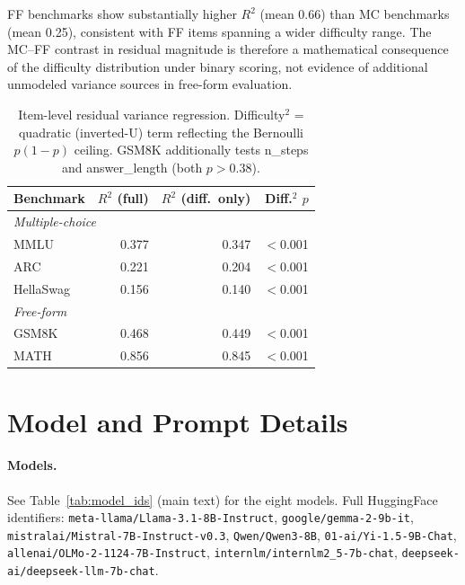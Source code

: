 FF benchmarks show substantially higher $R^2$ (mean 0.66) than MC benchmarks (mean 0.25), consistent with FF items spanning a wider difficulty range. The MC--FF contrast in residual magnitude is therefore a mathematical consequence of the difficulty distribution under binary scoring, not evidence of additional unmodeled variance sources in free-form evaluation.

\begin{table}[h]
\centering
\caption{Item-level residual variance regression. Difficulty$^2$ = quadratic (inverted-U) term reflecting the Bernoulli $p(1{-}p)$ ceiling. GSM8K additionally tests n\_steps and answer\_length (both $p > 0.38$).}
\label{tab:ff_residual}
\scriptsize
\begin{tabular}{lrrr}
\toprule
Benchmark & $R^2$ (full) & $R^2$ (diff.\ only) & Diff.$^2$ $p$ \\
\midrule
\multicolumn{4}{l}{\textit{Multiple-choice}} \\
MMLU & 0.377 & 0.347 & $<$0.001 \\
ARC & 0.221 & 0.204 & $<$0.001 \\
HellaSwag & 0.156 & 0.140 & $<$0.001 \\
\midrule
\multicolumn{4}{l}{\textit{Free-form}} \\
GSM8K & 0.468 & 0.449 & $<$0.001 \\
MATH & 0.856 & 0.845 & $<$0.001 \\
\bottomrule
\end{tabular}
\end{table}

\section{Model and Prompt Details}
\label{app:models}

\paragraph{Models.} See Table~\ref{tab:model_ids} (main text) for the eight models. Full HuggingFace identifiers: \texttt{meta-llama/Llama-3.1-8B-Instruct}, \texttt{google/gemma-2-9b-it}, \texttt{mistralai/Mistral-7B-Instruct-v0.3}, \texttt{Qwen/Qwen3-8B}, \texttt{01-ai/Yi-1.5-9B-Chat}, \texttt{allenai/OLMo-2-1124-7B-Instruct}, \texttt{internlm/internlm2\_5-7b-chat}, \texttt{deepseek-ai/deepseek-llm-7b-chat}.

